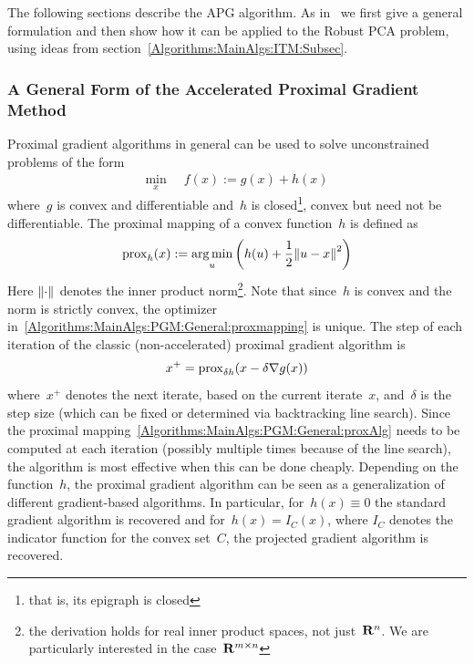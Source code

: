 The following sections describe the APG algorithm. As in~\cite{Lin:2009kx} we first give a general formulation and then show how it can be applied to the Robust PCA problem, using ideas from section~\ref{Algorithms:MainAlgs:ITM:Subsec}.


\subsubsection{A General Form of the Accelerated Proximal Gradient Method}
\label{Algorithms:MainAlgs:PGM:General:Subsubsec}

Proximal gradient algorithms in general can be used to solve unconstrained problems of the form 
%
\begin{align}
\min_{x} \;\; &f(x) := g(x) + h(x)
\label{Algorithms:MainAlgs:PGM:General:GenPGA}
\end{align}
%
where~$g$ is convex and differentiable and~$h$ is closed\footnote{that is, its epigraph is closed}, convex but need not be differentiable. The proximal mapping of a convex function~$h$ is defined as
%
\begin{align}
{\operatorname{prox}_{h}(x)} := \operatorname*{arg\,min}_u \left( h(u) + \frac{1}{2}{\left\|u-x\right\|}_{}^{2} \right)
\label{Algorithms:MainAlgs:PGM:General:proxmapping}
\end{align}
%
Here ${\left\|\cdot\right\|}_{}^{}$ denotes the inner product norm\footnote{the derivation holds for real inner product spaces, not just~${\mathbf R}^n$. We are particularly interested in the case~${\mathbf R}^{m\times n}$}. Note that since~$h$ is convex and the norm is strictly convex, the optimizer in~\eqref{Algorithms:MainAlgs:PGM:General:proxmapping} is unique. The step of each iteration of the classic (non-accelerated) proximal gradient algorithm is
%
\begin{align}
x^+ = {\operatorname{prox}_{\delta h}(x-\delta \nabla g(x))}
\label{Algorithms:MainAlgs:PGM:General:proxAlg}
\end{align}
%
where~$x^+$ denotes the next iterate, based on the current iterate~$x$, and~$\delta$ is the step size (which can be fixed or determined via backtracking line search). Since the proximal mapping~\eqref{Algorithms:MainAlgs:PGM:General:proxAlg} needs to be computed at each iteration (possibly multiple times because of the line search), the algorithm is most effective when this can be done cheaply. Depending on the function~$h$, the proximal gradient algorithm can be seen as a generalization of different gradient-based algorithms. In particular, for~$h(x) \equiv 0$ the standard gradient algorithm is recovered and for~$h(x) = I_C(x)$, where $I_C$ denotes the indicator function for the convex set~$C$, the projected gradient algorithm is recovered. 

